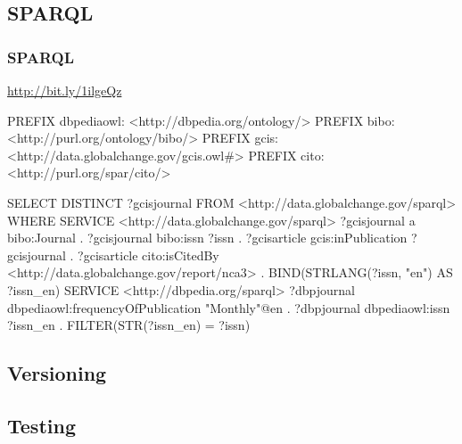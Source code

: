 \documentclass{beamer}
\begin{document}
\subsection{SPARQL}
\begin{frame}[fragile]
    \frametitle{SPARQL}
     \url{http://bit.ly/1ilgeQz}
\begin{tiny}
\begin{semiverbatim}
PREFIX dbpediaowl: <http://dbpedia.org/ontology/>
PREFIX bibo: <http://purl.org/ontology/bibo/>
PREFIX gcis: <http://data.globalchange.gov/gcis.owl#>
PREFIX cito: <http://purl.org/spar/cito/>

SELECT DISTINCT ?gcisjournal
FROM <http://data.globalchange.gov/sparql>
WHERE {
{
   SERVICE <http://data.globalchange.gov/sparql> {
     ?gcisjournal a bibo:Journal .
     ?gcisjournal bibo:issn ?issn .
     ?gcisarticle gcis:inPublication ?gcisjournal .
     ?gcisarticle cito:isCitedBy <http://data.globalchange.gov/report/nca3> .
   } 
   BIND(STRLANG(?issn, "en") AS ?issn_en)
}  
   SERVICE <http://dbpedia.org/sparql> {
     ?dbpjournal dbpediaowl:frequencyOfPublication "Monthly"@en .
     ?dbpjournal dbpediaowl:issn ?issn_en .
     FILTER(STR(?issn_en) = ?issn)
   } 
}  
\end{semiverbatim}
\end{tiny}

\end{frame}


\subsection{Versioning}

\subsection{Testing}
\end{document}
